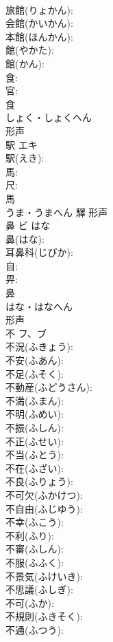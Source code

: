 \documentclass[8pt]{extreport}
\begin{document}
\begin{CJK}{UTF8}{min}
\\	旅館(りょかん): 
\\	会館(かいかん): 
\\	本館(ほんかん): 
\\	館(やかた): 
\\	館(かん): 
\\	食: 
\\	官: 
\\	食	
\\	しょく・しょくへん	
\\	形声 
\\	駅	エキ			
\\	駅(えき): 
\\	馬: 
\\	尺: 
\\	馬	
\\	うま・うまへん	驛	形声 
\\	鼻	ビ	はな		
\\	鼻(はな): 
\\	耳鼻科(じびか): 
\\	自: 
\\	畀: 
\\	鼻	
\\	はな・はなへん	
\\	形声 
\\	不	フ、ブ			
\\	不況(ふきょう): 
\\	不安(ふあん): 
\\	不足(ふそく): 
\\	不動産(ふどうさん): 
\\	不満(ふまん): 
\\	不明(ふめい): 
\\	不振(ふしん): 
\\	不正(ふせい): 
\\	不当(ふとう): 
\\	不在(ふざい): 
\\	不良(ふりょう): 
\\	不可欠(ふかけつ): 
\\	不自由(ふじゆう): 
\\	不幸(ふこう): 
\\	不利(ふり): 
\\	不審(ふしん): 
\\	不服(ふふく): 
\\	不景気(ふけいき): 
\\	不思議(ふしぎ): 
\\	不可(ふか): 
\\	不規則(ふきそく): 
\\	不通(ふつう): 

\end{CJK}
\end{document}
